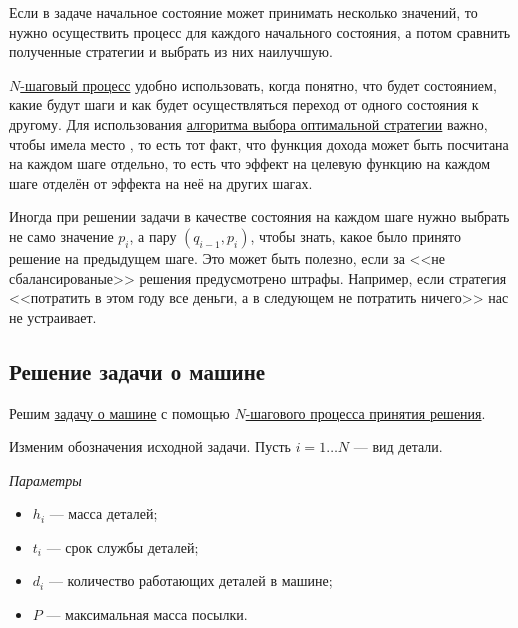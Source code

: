 Если в задаче начальное состояние может принимать несколько значений, то нужно осуществить процесс для каждого начального состояния, а потом сравнить полученные стратегии и выбрать из них наилучшую.

\remark

\hyperref[def:n_step_process]{$N$-шаговый процесс} удобно использовать, когда понятно, что будет состоянием, какие будут шаги и как будет осуществляться переход от одного состояния к другому. Для использования \hyperref[def:n_step_process]{алгоритма выбора оптимальной стратегии} важно, чтобы имела место , то есть тот факт, что функция дохода может быть посчитана на каждом шаге отдельно, то есть что эффект на целевую функцию на каждом шаге отделён от эффекта на неё на других шагах.

\remark

Иногда при решении задачи в качестве состояния на каждом шаге нужно выбрать не само значение $p_i$, а пару $(q_{i-1}, p_i)$, чтобы знать, какое было принято решение на предыдущем шаге. Это может быть полезно, если за <<не сбалансированые>> решения предусмотрено штрафы. Например, если стратегия <<потратить в этом году все деньги, а в следующем не потратить ничего>> нас не устраивает.

\subsection{Решение задачи о машине}

Решим \hyperref[pr:car_on_island]{задачу о машине} с помощью \hyperref[def:n_step_process]{$N$-шагового процесса принятия решения}.

\nstepprocess

Изменим обозначения исходной задачи. Пусть $i = 1 \dots N$ --- вид детали.

\bigskip

\textit{Параметры}

\begin{itemize}[nosep]
	\item $h_i$ --- масса деталей;
	
	\item $t_i$ --- срок службы деталей;
	
	\item $d_i$ --- количество работающих деталей в машине;
	
	\item $P$ --- максимальная масса посылки.
\end{itemize}

